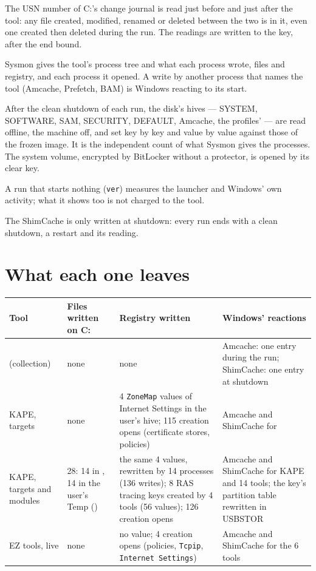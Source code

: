 \documentclass[11pt,a4paper,oneside]{report}
\begin{document}
\begin{description}[style=nextline,leftmargin=1em]
  \item[The files] The USN number of C:'s change journal is read just before
        and just after the tool: any file created, modified, renamed or deleted
        between the two is in it, even one created then deleted during the run.
        The readings are written to the key, after the end bound.
  \item[The author] Sysmon gives the tool's process tree and what each process
        wrote, files and registry, and each process it opened. A write by
        another process that names the tool (Amcache, Prefetch, BAM) is
        Windows reacting to its start.
  \item[The registry] After the clean shutdown of each run, the disk's hives
        --- SYSTEM, SOFTWARE, SAM, SECURITY, DEFAULT, Amcache, the profiles'
        --- are read offline, the machine off, and set key by key and value by
        value against those of the frozen image. It is the independent count of
        what Sysmon gives the processes. The system volume, encrypted by
        BitLocker without a protector, is opened by its clear key.
  \item[The control] A run that starts nothing (\texttt{ver}) measures the
        launcher and Windows' own activity; what it shows too is not charged
        to the tool.
  \item[The deferred] The ShimCache is only written at shutdown: every run
        ends with a clean shutdown, a restart and its reading.
\end{description}

\section{What each one leaves}

\begin{longtable}{@{}L{2.5cm}L{3.0cm}L{4.0cm}L{5.5cm}@{}}
\toprule
\textbf{Tool} & \textbf{Files written on C:} & \textbf{Registry written} &
  \textbf{Windows' reactions} \\
\midrule\endhead
\wac{} (collection) & none & none & Amcache: one entry during the run;
  ShimCache: one entry at shutdown \\
KAPE, targets & none & 4 \texttt{ZoneMap} values of Internet Settings in the
  user's hive; 115 creation opens (certificate stores, policies) & Amcache
  and ShimCache for  \\
KAPE, targets and modules & 28: 14 in
  , 14 in the user's Temp
  () & the same 4 values,
  rewritten by 14 processes (136 writes); 8 RAS tracing keys created by 4
  tools (56 values); 126 creation opens & Amcache and ShimCache for KAPE and
  14 tools; the key's partition table rewritten in USBSTOR \\
EZ tools, live & none & no value; 4 creation opens (policies, \texttt{Tcpip},
  \texttt{Internet Settings}) & Amcache and ShimCache for the 6 tools \\
\bottomrule
\end{longtable}
\end{document}
